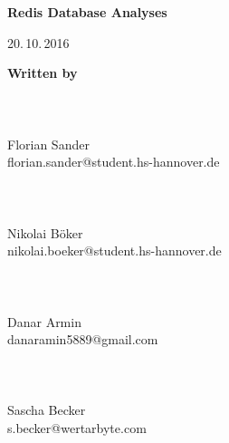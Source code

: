 \documentclass[11pt,DIV12,BCOR0mm,oneside,headings=normal,%
  numbers=noenddot,headsepline,headinclude]{scrreprt}
\begin{document}

\thispagestyle{empty}
{}

\begin{center}
  \vspace*{4\baselineskip}
  {\sffamily\bfseries\LARGE
    Redis Database Analyses\par}
  
  \vspace*{4\baselineskip}
  {\Large }

  \vfill
  {\Large }
  
  \vspace*{4\baselineskip}
  {\Large \par}
  
  \vspace*{4\baselineskip}
  {\Large 20.\,10.\,2016}
  
  \vspace*{4\baselineskip}
\end{center}


{\huge\textbf{Written by}} \\
\\
\\
\textbf{} \\
Florian Sander \\
florian.sander@student.hs-hannover.de \\
\\
\\
\textbf{} \\
Nikolai Böker \\
nikolai.boeker@student.hs-hannover.de \\
\\
\\
\textbf{} \\
Danar Armin \\
danaramin5889@gmail.com \\
\\
\\
\textbf{} \\
Sascha Becker \\
s.becker@wertarbyte.com \\
\\
\\
\\
\\


\tableofcontents    %


\newpage
{}




\end{document}
